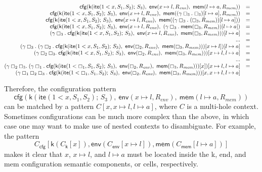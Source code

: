 \documentclass[UTF8,11pt]{article}
\theoremstyle{plain}
\theoremstyle{definition}
\theoremstyle{remark}
\newcommand{\hole}{\boxempty}
\newcommand{\ite}{\textsf{ite}}
\begin{document}
$$
\begin{array}{@{}rcl}
\textsf{cfg}
(
\textsf{k}(\ite(1 < x,S_1,S_2)\textsf{;\ }S_3),
\ \textsf{env}(x \mapsto l, R_\textit{env})
,
\ \textsf{mem}(l \mapsto a, R_\textit{mem})
)
&=&
\\
\textsf{cfg}
(
\textsf{k}(\ite(1 < x,S_1,S_2)\textsf{;\ }S_3),
\ \textsf{env}(x \mapsto l, R_\textit{env})
,
\ \textsf{mem}((\gamma\hole_3.\;\hole_3)[l \mapsto a], R_\textit{mem})
)
&=&
\\
\textsf{cfg}
(
\textsf{k}(\ite(1 < x,S_1,S_2)\textsf{;\ }S_3),
\ \textsf{env}(x \mapsto l, R_\textit{env})
,
\ \textsf{mem}((\gamma\hole_3.\;(\hole_3,R_\textit{mem}))[l \mapsto a])
)
&=&
\\
\textsf{cfg}
(
\textsf{k}(\ite(1 < x,S_1,S_2)\textsf{;\ }S_3),
\ \textsf{env}(x \mapsto l, R_\textit{env})
,
\ (\gamma\hole_3.\;\textsf{mem}(\hole_3,R_\textit{mem}))[l \mapsto a]
)
&=&
\\
(\gamma\hole_3.\;\textsf{cfg}
(
\textsf{k}(\ite(1 < x,S_1,S_2)\textsf{;\ }S_3),
\ \textsf{env}(x \mapsto l, R_\textit{env})
,
\ \textsf{mem}(\hole_3,R_\textit{mem})))[l \mapsto a]
&=&
\\
...
&=&
\\
(\gamma\hole_3.\;
(\gamma\hole_2.\;
\textsf{cfg}
(
\textsf{k}(\ite(1 < x,S_1,S_2)\textsf{;\ }S_3),
\ \textsf{env}(\hole_2, R_\textit{env})
,
\ \textsf{mem}(\hole_3,R_\textit{mem})))[x \mapsto l])[l \mapsto a]
&=&
\\
(\gamma\hole_2\hole_3.\;
\textsf{cfg}
(
\textsf{k}(\ite(1 < x,S_1,S_2)\textsf{;\ }S_3),
\ \textsf{env}(\hole_2, R_\textit{env})
,
\ \textsf{mem}(\hole_3,R_\textit{mem})))[x \mapsto l,l \mapsto a]
&=&
\\
...
&=&
\\
(\gamma\hole_2\hole_3.\;
(\gamma\hole_1.\;
\textsf{cfg}
(
\textsf{k}(\ite(1 < \hole_1,S_1,S_2)\textsf{;\ }S_3),
\ \textsf{env}(\hole_2, R_\textit{env})
,
\ \textsf{mem}(\hole_3,R_\textit{mem})))[x]
)[x \mapsto l,l \mapsto a]
&=&
\\
(\gamma\hole_1\hole_2\hole_3.\;
\textsf{cfg}
(
\textsf{k}(\ite(1 < \hole_1,S_1,S_2)\textsf{;\ }S_3),
\ \textsf{env}(\hole_2, R_\textit{env})
,
\ \textsf{mem}(\hole_3, R_\textit{mem})
))
[x, x \mapsto l, l \mapsto a]
\end{array}
$$

Therefore, the configuration pattern
$$
\textsf{cfg}
(
\textsf{k}(\ite(1 < x,S_1,S_2)\textsf{;\ }S_3),
\ \textsf{env}(x \mapsto l, R_\textit{env})
,
\ \textsf{mem}(l \mapsto a, R_\textit{mem})
)
$$
can be matched by a pattern $C[x,x\mapsto l,l\mapsto a]$, where $C$ is a
multi-hole context.
Sometimes configurations can be much more complex than the above, in which
case one may want to make use of nested contexts to disambiguate.
For example, the pattern
$$
C_{\textsf{cfg}}[\textsf{k}(C_{\textsf{k}}[x]),\textsf{env}(C_{\textsf{env}}[x\mapsto l]),\textsf{mem}(C_{\textsf{mem}}[l\mapsto a])]
$$
makes it clear that $x$, $x\mapsto l$, and $l\mapsto a$ must be located inside
the \textsf{k}, \textsf{end}, and \textsf{mem} configuration semantic
components, or cells, respectively.
\end{document}

